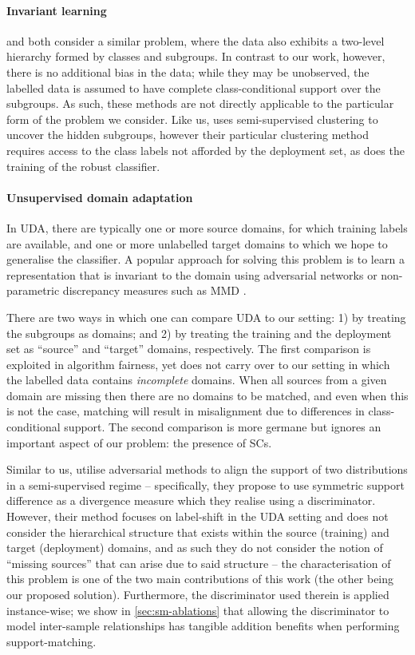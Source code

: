 \paragraph{Invariant learning}
%
\citet{SohDunAngGuetal20} and \citet{creager2021environment} both consider a similar problem, where
the data also exhibits a two-level hierarchy formed by classes and subgroups.
%
In contrast to our work, however, there is no additional bias in the data; while they may be
unobserved, the labelled data is assumed to have complete class-conditional support over the
subgroups.
%
As such, these methods are not directly applicable to the particular form of the problem we
consider.
%
Like us, \citet{SohDunAngGuetal20} uses semi-supervised clustering to uncover the hidden subgroups,
however their particular clustering method requires access to the class labels not afforded by the
deployment set, as does the training of the robust classifier.

\paragraph{Unsupervised domain adaptation}
%
In \acf{UDA}, there are typically one or more source domains, for which training labels are
available, and one or more unlabelled target domains to which we hope to generalise the classifier.
%
A popular approach for solving this problem is to learn a representation that is invariant to the
domain using adversarial networks \citep{ganin2016domain} or non-parametric discrepancy measures
such as \ac{MMD} \citep{gretton2012kernel}.
%

There are two ways in which one can compare UDA to our setting: 1) by treating the subgroups as
domains; and 2) by treating the training and the deployment set as ``source'' and ``target''
domains, respectively.
%
The first comparison is exploited in algorithm fairness, yet does not carry over to our setting in
which the labelled data contains \emph{incomplete} domains. 
%
When all sources from a given domain are missing then there are no domains to be matched, and even
when this is not the case, matching will result in misalignment due to differences in
class-conditional support.
%
The second comparison is more germane but ignores an important aspect of our problem: the presence
of \acp{SC}.
%

Similar to us, \citet{tong2022adversarial} utilise adversarial methods to align the support of two
distributions in a semi-supervised regime -- specifically, they propose to use symmetric support
difference as a divergence measure which they realise using a discriminator. 
%
However, their method focuses on label-shift in the \ac{UDA} setting and does not consider the
hierarchical structure that exists within the source (training) and target (deployment) domains,
and as such they do not consider the notion of ``missing sources'' that can arise due to said
structure -- the characterisation of this problem is one of the two main contributions of this work
(the other being our proposed solution). 
%
Furthermore, the discriminator used therein is applied instance-wise; we show in
\ref{sec:sm-ablations} that allowing the discriminator to model inter-sample relationships has
tangible addition benefits when performing support-matching.

